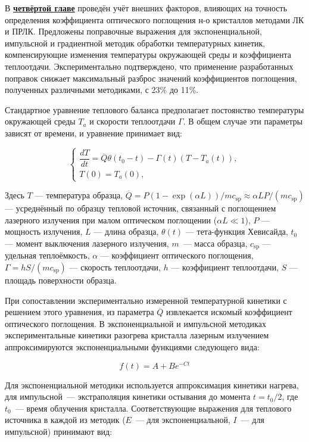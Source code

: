 В \underline{\textbf{четвёртой главе}} проведён учёт внешних факторов, влияющих на точность определения коэффициента оптического поглощения н-о кристаллов методами ЛК и ПРЛК. Предложены поправочные выражения для экспоненциальной, импульсной и градиентной методик обработки температурных кинетик, компенсирующие изменения температуры окружающей среды и коэффициента теплоотдачи. Экспериментально подтверждено, что применение разработанных поправок снижает максимальный разброс значений коэффициентов поглощения, полученных различными методиками, с 23\% до 11\%.

Стандартное уравнение теплового баланса предполагает постоянство температуры окружающей среды $T_a$ и скорости теплоотдачи $\Gamma$. В общем случае эти параметры зависят от времени, и уравнение принимает вид:

\begin{equation}
	\begin{cases}
		\dfrac{d T}{d t} = \overline{Q}\theta(t_0 - t) - \Gamma(t)(T - T_a(t)), \\
		T(0) = T_a(0),
	\end{cases}
	\label{eq:syno_balance_equation_timed}
\end{equation}

Здесь $T$ --- температура образца, $\overline{Q} = P(1 - \exp(\alpha L))/mc_{\text{sp}} \approx \alpha LP/(mc_{\text{sp}})$ --- усреднённый по образцу тепловой источник, связанный с поглощением лазерного излучения при малом оптическом поглощении ($\alpha L \ll 1$), $P$ --- мощность излучения, $L$ --- длина образца, $\theta(t)$ --- тета-функция Хевисайда, $t_0$ --- момент выключения лазерного излучения, $m$~--- масса образца, $c_{\text{sp}}$ --- удельная теплоёмкость, $\alpha$ --- коэффициент оптического поглощения, $\Gamma = hS/(mc_{\text{sp}})$ --- скорость теплоотдачи, $h$ --- коэффициент теплоотдачи, $S$ --- площадь поверхности образца.

При сопоставлении экспериментально измеренной температурной кинетики с решением этого уравнения, из параметра $\overline{Q}$ извлекается искомый коэффициент оптического поглощения. В экспоненциальной и импульсной методиках экспериментальные кинетики разогрева кристалла лазерным излучением аппроксимируются экспоненциальными функциями следующего вида:

\begin{equation}
	f(t) = A + Be^{-Ct}
	\label{eq:syno_exp_fit}
\end{equation}

Для экспоненциальной методики используется аппроксимация кинетики нагрева, для импульсной~--- экстраполяция кинетики остывания до момента $t=t_0/2$, где $t_0$~--- время облучения кристалла. Соответствующие выражения для теплового источника в каждой из методик ($E$~--- для экспоненциальной, $I$~--- для импульсной) принимают вид:

